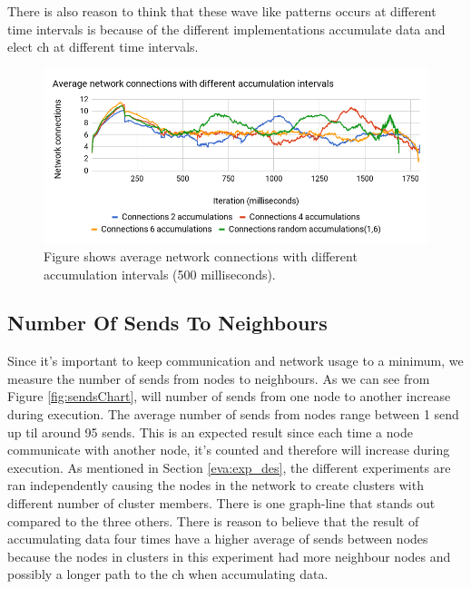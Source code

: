 \documentclass[USenglish]{uit-thesis}
\begin{document}
There is also reason to think that these wave like patterns occurs at different time intervals is because of the different implementations accumulate data and elect \gls{ch} at different time intervals.


\begin{figure} [ht]
\centering
\includegraphics[width=\textwidth]{netconnChart.png}
\caption{Figure shows average network connections with different accumulation intervals (500 milliseconds).}
\label{fig:netconnChart}
\end{figure}


\newpage 

\subsection{Number Of Sends To Neighbours}
Since it's important to keep communication and network usage to a minimum, we measure the number of sends from nodes to neighbours. 
As we can see from Figure \ref{fig:sendsChart}, will number of sends from one node to another increase during execution. The average number of sends from nodes range between 1 send up til around 95 sends. This is an expected result since each time a node communicate with another node, it's counted and therefore will increase during execution.
As mentioned in Section \ref{eva:exp_des}, the different experiments are ran independently causing the nodes in the network to create clusters with different number of cluster members. There is one graph-line that stands out compared to the three others. There is reason to believe that the result of accumulating data four times have a higher average of sends between nodes because the nodes in clusters in this experiment had more neighbour nodes and possibly a longer path to the \gls{ch} when accumulating data.
\end{document}

